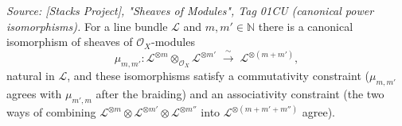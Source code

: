 \begin{lemma}
  \label{lem:sheafTensorPow_add}
  \textit{Source: [Stacks Project], "Sheaves of Modules", Tag 01CU (canonical
  power isomorphisms).}
  For a line bundle \(\mathcal{L}\) and \(m, m' \in \mathbb{N}\) there is a
  canonical isomorphism of sheaves of \(\mathcal{O}_X\)-modules
  \[
    \mu_{m,m'} :
    \mathcal{L}^{\otimes m} \otimes_{\mathcal{O}_X} \mathcal{L}^{\otimes m'}
    \;\xrightarrow{\ \sim\ }\; \mathcal{L}^{\otimes (m+m')},
  \]
  natural in \(\mathcal{L}\), and these isomorphisms satisfy a commutativity
  constraint (\(\mu_{m,m'}\) agrees with \(\mu_{m',m}\) after the braiding) and
  an associativity constraint (the two ways of combining
  \(\mathcal{L}^{\otimes m} \otimes \mathcal{L}^{\otimes m'} \otimes
  \mathcal{L}^{\otimes m''}\) into \(\mathcal{L}^{\otimes (m+m'+m'')}\) agree).
\end{lemma}

